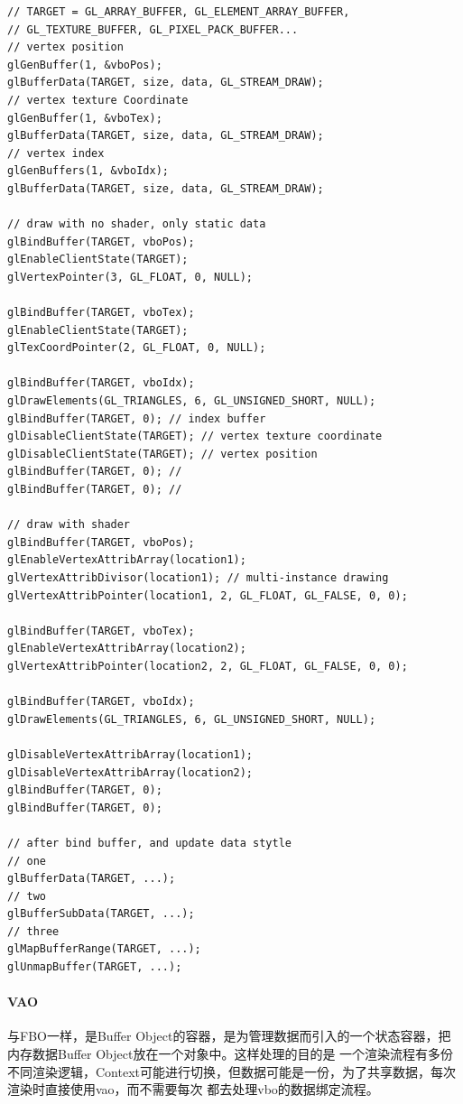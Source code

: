 \begin{lstlisting}
// TARGET = GL_ARRAY_BUFFER, GL_ELEMENT_ARRAY_BUFFER, 
// GL_TEXTURE_BUFFER, GL_PIXEL_PACK_BUFFER... 
// vertex position
glGenBuffer(1, &vboPos);
glBufferData(TARGET, size, data, GL_STREAM_DRAW);
// vertex texture Coordinate
glGenBuffer(1, &vboTex);
glBufferData(TARGET, size, data, GL_STREAM_DRAW);
// vertex index     
glGenBuffers(1, &vboIdx);
glBufferData(TARGET, size, data, GL_STREAM_DRAW);

// draw with no shader, only static data 
glBindBuffer(TARGET, vboPos);
glEnableClientState(TARGET);
glVertexPointer(3, GL_FLOAT, 0, NULL);

glBindBuffer(TARGET, vboTex);
glEnableClientState(TARGET);
glTexCoordPointer(2, GL_FLOAT, 0, NULL);

glBindBuffer(TARGET, vboIdx);
glDrawElements(GL_TRIANGLES, 6, GL_UNSIGNED_SHORT, NULL);
glBindBuffer(TARGET, 0); // index buffer 
glDisableClientState(TARGET); // vertex texture coordinate
glDisableClientState(TARGET); // vertex position
glBindBuffer(TARGET, 0); // 
glBindBuffer(TARGET, 0); // 

// draw with shader
glBindBuffer(TARGET, vboPos);
glEnableVertexAttribArray(location1);
glVertexAttribDivisor(location1); // multi-instance drawing
glVertexAttribPointer(location1, 2, GL_FLOAT, GL_FALSE, 0, 0);

glBindBuffer(TARGET, vboTex);
glEnableVertexAttribArray(location2);
glVertexAttribPointer(location2, 2, GL_FLOAT, GL_FALSE, 0, 0);

glBindBuffer(TARGET, vboIdx);
glDrawElements(GL_TRIANGLES, 6, GL_UNSIGNED_SHORT, NULL);

glDisableVertexAttribArray(location1); 
glDisableVertexAttribArray(location2);
glBindBuffer(TARGET, 0);  
glBindBuffer(TARGET, 0);  

// after bind buffer, and update data stytle 
// one 
glBufferData(TARGET, ...);
// two 
glBufferSubData(TARGET, ...);
// three 
glMapBufferRange(TARGET, ...);
glUnmapBuffer(TARGET, ...);
\end{lstlisting}

\paragraph{VAO}

与FBO一样，是Buffer Object的容器，是为管理数据而引入的一个状态容器，把内存数据Buffer Object放在一个对象中。这样处理的目的是
一个渲染流程有多份不同渲染逻辑，Context可能进行切换，但数据可能是一份，为了共享数据，每次渲染时直接使用vao，而不需要每次
都去处理vbo的数据绑定流程。 

